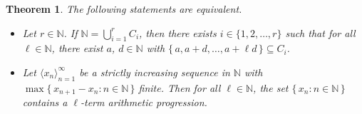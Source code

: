 \documentclass[12pt]{article}
\theoremstyle{plain}
\newtheorem{thm}{Theorem}[section]
\theoremstyle{definition}
\newcommand{\la}{\langle}
\newcommand{\ra}{\rangle}
\newcommand{\bbN}{\mathbb{N}}
\begin{document}
\begin{thm}
  \label{thm:vdwEqSyn}
  The following statements are equivalent.
  \begin{itemize}
    \item[(a)] Let $r \in \bbN$.
      If $\bbN = \bigcup_{i=1}^r C_i$, then there exists $i \in \{1, 2, \ldots, r\}$ such that for all $\ell \in \bbN$, there exist $a$, $d \in \bbN$ with $\{\, a, a+d, \ldots, a+\ell d \,\} \subseteq C_i$. 

    \item[(b)] Let $\la x_n \ra_{n=1}^\infty$ be a strictly increasing sequence in $\bbN$ with $\max\{\, x_{n+1} - x_n : n \in \bbN \,\}$ finite.
      Then for all $\ell \in \bbN$, the set $\{\, x_n : n \in \bbN \,\}$ contains a \mbox{$\ell$-term} arithmetic progression.
  \end{itemize}
\end{thm}
\end{document}
